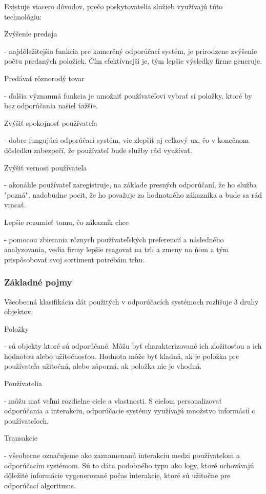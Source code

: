 Existuje viacero dôvodov, prečo poskytovatelia služieb využívajú túto technológiu: 
 \begin{itemize}[leftmargin=*]
{\bf \item Zvýšenie predaja} - najdôležitejšia funkcia pre komerčný odporúčací systém, je prirodzene zvýšenie počtu predaných položiek. Čím efektívnejší je, tým lepšie výsledky firme generuje. 

{\bf \item Predávať rôznorodý tovar} - ďalšia významná funkcia je umožniť používateľovi vybrať si položky, ktoré by bez odporúčania našiel ťažšie. 
 
{\bf \item Zvýšiť spokojnosť používateľa} - dobre fungujúci odporúčací systém, vie zlepšiť aj celkový \acrshort{ux}, čo v konečnom dôsledku zabezpečí, že používateľ bude služby rád využívať. 

{\bf \item Zvýšiť vernosť používateľa} - akonáhle používateľ zaregistruje, na základe presných odporúčaní, že ho služba "pozná", nadobudne pocit, že ho považuje za hodnotného zákazníka a bude sa rád vracať.
	
{\bf \item Lepšie rozumieť tomu, čo zákazník chce} - pomocou zbierania rôznych používateľských preferencií a následného analyzovania, vedia firmy lepšie reagovať na trh a zmeny na ňom a tým prispôsobovať svoj sortiment potrebám trhu. \cite{rs1} \newline

\end{itemize} 


\subsubsection{Základné pojmy}
Všeobecná klasifikácia dát použitých v odporúčacích systémoch rozlišuje 3 druhy objektov.
 \begin{itemize}[leftmargin=*]
{\bf \item Položky} - sú objekty ktoré sú odporúčané. Môžu byť charakterizované ich zložitosťou a ich hodnotou alebo užitočnosťou. Hodnota môže byť kladná, ak je položka pre používateľa užitočná, alebo záporná, ak položka nie je vhodná. 
{\bf \item Používatelia} - môžu mať veľmi rozdielne ciele a vlastnosti. S cieľom personalizovať odporúčania a interakciu, odporúčacie systémy využívajú množstvo informácií o používateľoch.
{\bf \item Transakcie} - všeobecne označujeme ako zaznamenanú interakciu medzi používateľom a odporúčacím systémom. Sú to dáta podobného typu ako logy, ktoré uchovávajú dôležité informácie vygenerované počas interakcie, ktoré sú užitočne pre odporúčací algoritmus. \cite{rs1}
\end{itemize} 


